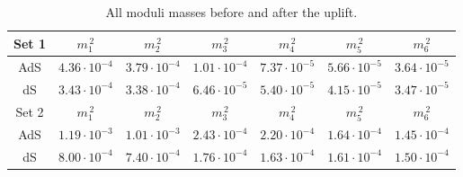 \documentclass[a4paper,12pt]{report}
\begin{document}
\begin{table}[H]
\center
\begin{tabular}{|c|c|c|c|c|c|c|}\hline
Set 1 & $m_{1}^{\,2}$ & $m_{2}^{\,2}$  & $m_{3}^{\,2}$ & $m_{4}^{\,2}$ & $m_{5}^{\,2}$ & $m_{6}^{\,2}$ \\\hline
AdS & $4.36\cdot10^{-4}$& $3.79\cdot 10^{-4}$& $1.01\cdot 10^{-4}$ & $7.37\cdot 10^{-5}$& $5.66 \cdot 10^{-5}$ & $3.64 \cdot 10^{-5}$ \\\hline
dS & $3.43\cdot10^{-4}$& $3.38\cdot 10^{-4}$& $6.46\cdot 10^{-5}$ & $5.40\cdot 10^{-5}$& $4.15 \cdot 10^{-5}$ & $3.47 \cdot 10^{-5}$ \\\hline\hline
Set 2 & $m_{1}^{\,2}$ & $m_{2}^{\,2}$  & $m_{3}^{\,2}$ & $m_{4}^{\,2}$ & $m_{5}^{\,2}$ & $m_{6}^{\,2}$ \\\hline
AdS & $1.19 \cdot 10^{-3}$ & $1.01\cdot 10^{-3}$& $2.43 \cdot 10^{-4}$ & $2.20 \cdot 10^{-4}$& $1.64 \cdot 10^{-4}$ & $1.45\cdot 10^{-4}$  \\\hline
dS & $8.00 \cdot 10^{-4}$ & $7.40 \cdot 10^{-4}$ & $1.76\cdot 10^{-4}$ & $1.63 \cdot 10^{-4}$ & $1.61 \cdot 10^{-4}$& $1.50 \cdot 10^{-4}$  \\\hline
\end{tabular}
\caption{All moduli masses before and after the uplift.} 
\label{tab:IIAupliftmass}
\end{table}
\end{document}
